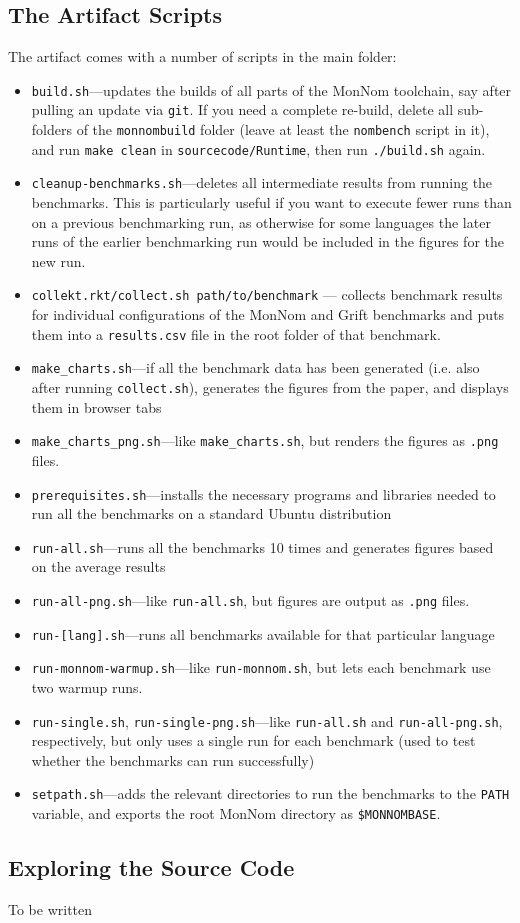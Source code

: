 \documentclass{article}
\begin{document}
\subsection{The Artifact Scripts}
The artifact comes with a number of scripts in the main folder:
\begin{itemize}
\item \texttt{build.sh}---updates the builds of all parts of the MonNom toolchain, say after pulling an update via \texttt{git}.
If you need a complete re-build, delete all sub-folders of the \texttt{monnombuild} folder (leave at least the \texttt{nombench} script in it), and run \texttt{make clean} in \texttt{sourcecode/Runtime}, then run \texttt{./build.sh} again.
\item \texttt{cleanup-benchmarks.sh}---deletes all intermediate results from running the benchmarks.
This is particularly useful if you want to execute fewer runs than on a previous benchmarking run, as otherwise for some languages the later runs of the earlier benchmarking run would be included in the figures for the new run.
\item \texttt{collekt.rkt/collect.sh path/to/benchmark} --- collects benchmark results for individual configurations of the MonNom and Grift benchmarks and puts them into a \texttt{results.csv} file in the root folder of that benchmark.
\item \texttt{make\_charts.sh}---if all the benchmark data has been generated (i.e. also after running \texttt{collect.sh}), generates the figures from the paper, and displays them in browser tabs
\item \texttt{make\_charts\_png.sh}---like \texttt{make\_charts.sh}, but renders the figures as \texttt{.png} files.
\item \texttt{prerequisites.sh}---installs the necessary programs and libraries needed to run all the benchmarks on a standard Ubuntu distribution
\item \texttt{run-all.sh}---runs all the benchmarks 10 times and generates figures based on the average results
\item \texttt{run-all-png.sh}---like \texttt{run-all.sh}, but figures are output as \texttt{.png} files.
\item \texttt{run-[lang].sh}---runs all benchmarks available for that particular language
\item \texttt{run-monnom-warmup.sh}---like \texttt{run-monnom.sh}, but lets each benchmark use two warmup runs.
\item \texttt{run-single.sh}, \texttt{run-single-png.sh}---like \texttt{run-all.sh} and \texttt{run-all-png.sh}, respectively, but only uses a single run for each benchmark (used to test whether the benchmarks can run successfully)
\item \texttt{setpath.sh}---adds the relevant directories to run the benchmarks to the \texttt{PATH} variable, and exports the root MonNom directory as \texttt{\$MONNOMBASE}.
\end{itemize}

\subsection{Exploring the Source Code}
\label{sec:sourcecode}
To be written
\end{document}
